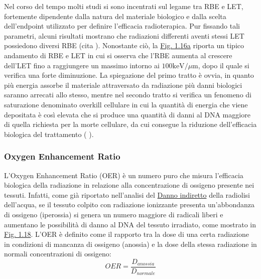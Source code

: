 \documentclass[12pt,a4paper,twoside]{report}
\begin{document}
	Nel corso del tempo molti studi si sono incentrati sul legame tra RBE e LET, fortemente dipendente dalla natura del materiale biologico e dalla scelta dell'endpoint utilizzato per definire l'efficacia radioterapica. Pur fissando tali parametri, alcuni risultati mostrano che radiazioni differenti aventi stessi LET possiedono diversi RBE (cita
	). Nonostante ciò, la \hyperref[fig:let_rbe]{Fig. 1.16a} riporta un tipico andamento di RBE e LET in cui si osserva che l'RBE aumenta al crescere dell'LET fino a raggiungere un massimo intorno ai $100\mbox{keV}/\mu\mbox{m}$, dopo il quale si verifica una forte diminuzione. La spiegazione del primo tratto è ovvia, in quanto più energia assorbe il materiale attraversato da radiazione più danni biologici saranno arrecati allo stesso, mentre nel secondo tratto si verifica un fenomeno di saturazione denominato overkill cellulare in cui la quantità di energia che viene depositata è così elevata che si produce una quantità di danni al DNA maggiore di quella richiesta per la morte cellulare, da cui consegue la riduzione dell'efficacia biologica del trattamento (
	).
	
	\subsubsection{Oxygen Enhancement Ratio}\label{par:oer}
	L'Oxygen Enhancement Ratio (OER) è un numero puro che misura l'efficacia biologica della radiazione in relazione alla concentrazione di ossigeno presente nei tessuti. Infatti, come già riportato nell'analisi del \hyperref[par:danno_indiretto]{Danno indiretto} della radiolisi dell'acqua, se il tessuto colpito con radiazione ionizzante presenta un'abbondanza di ossigeno (iperossia) si genera un numero maggiore di radicali liberi e aumentano le possibilità di danno al DNA del tessuto irradiato, come mostrato in \hyperref[fig:oer_survival]{Fig. 1.18}. L'OER è definito come il rapporto tra la dose di una certa radiazione in condizioni di mancanza di ossigeno (anossia) e la dose della stessa radiazione in normali concentrazioni di ossigeno:
	\begin{equation}
		OER=\frac{D_{anossia}}{D_{normale}}
		\label{eq:oer}
	\end{equation}
	
\end{document}
